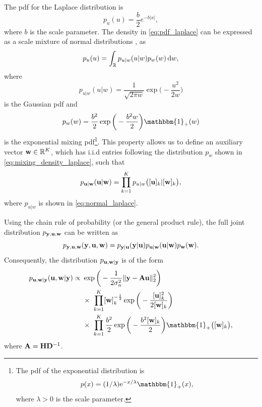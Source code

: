 \documentclass[journal]{IEEEtran}
\begin{document}
The pdf for the Laplace distribution is
\begin{equation}\label{eq:pdf_laplace}
    p_u(u) = \frac{b}{2}e^{-b |x|},
\end{equation}
where $b$ is the scale parameter. The density in \eqref{eq:pdf_laplace} can be expressed as a scale mixture of normal distributions \cite{andrews1974scale}, as
\begin{equation}
    p_u(u) = \int_{\mathbb{R}} p_{u|w}(u|w) p_w(w) \,\mathrm{d} w,
\end{equation}
where
\begin{equation}\label{eq:normal_laplace}
    p_{u|w}(u|w) = \frac{1}{\sqrt{2 \pi w}} \exp\bigg(-\frac{u^2}{2 w}\bigg)
\end{equation}
is the Gaussian pdf and
\begin{equation}\label{eq:mixing_density_laplace}
    p_w(w) = \frac{b^2}{2}\exp\bigg(-\frac{b^2 w}{2}\bigg) \mathbbm{1}_{+}(w)
\end{equation}
is the exponential mixing pdf\footnote{The pdf of the exponential distribution is \begin{equation*} p(x) = (1/\lambda) \mathrm{e}^{-x/\lambda} \mathbbm{1}_{+}(x), \end{equation*} where $\lambda > 0$ is the scale parameter.}. This property allows us to define an auxiliary vector ${\bf{w}} \in \mathbb{R}^K$, which has i.i.d entries following the distribution $p_w$ shown in \eqref{eq:mixing_density_laplace}, such that
\begin{equation}\label{eq:aux_var_property_laplace}
    p_{{\bf{u}} | {\bf{w}}}({\bf{u}} | {\bf{w}}) = \prod_{k=1}^{K} p_{u|w}\big([{\bf{u}}]_k | [{\bf{w}}]_k\big),
\end{equation}
where $p_{u|w}$ is shown in \eqref{eq:normal_laplace}.

Using the chain rule of probability (or the general product rule), the full joint distribution $p_{{\bf{y}}, {\bf{u}}, {\bf{w}}}$ can be written as
\begin{equation}\label{eq:full_joint_distribution_laplace}
    p_{{\bf{y}}, {\bf{u}}, {\bf{w}}}({\bf{y}}, {\bf{u}}, {\bf{w}}) = p_{{\bf{y}} | {\bf{u}}}({\bf{y}} | {\bf{u}}) p_{{\bf{u}} | {\bf{w}}}({\bf{u}} | {\bf{w}}) p_{{\bf{w}}}({\bf{w}}).
\end{equation}
Consequently, the distribution $p_{{\bf{u}}, {\bf{w}} | {\bf{y}}}$ is of the form
\begin{align}\label{eq:conditional_joint_distribution_laplace}
    p_{\M u, \M w | \M y}(\M u, \M w | \M y) \propto \ &\exp\bigg(-\frac{1}{2 \sigma_n^2} \|\M y - \M A \M u \|_{2}^{2}\bigg) \nonumber \\
    &\times \ \prod_{k=1}^{K}[\M w]_k^{-\frac{1}{2}} \exp\bigg(-\frac{[\M u]_k^2}{2 [\M w]_k}\bigg) \nonumber \\
    &\times \ \prod_{k=1}^{K} \frac{b^2}{2}\exp\bigg(-\frac{b^2 [\M w]_k}{2}\bigg) \mathbbm{1}_{+}\big([\M w]_k\big),
\end{align}
where ${\bf{A}} = {\bf{H}} {\bf{D}}^{-1}$.
\end{document}
